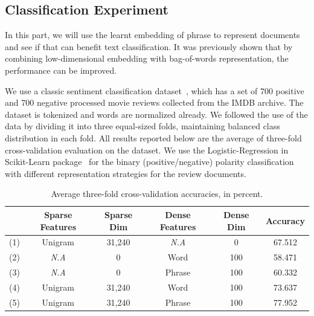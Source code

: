 \subsection{Classification Experiment}

In this part, we will use the learnt embedding of phrase to represent documents
and see if that can benefit text classification. It was previously shown that by
combining low-dimensional embedding with bag-of-words representation, the
performance can be improved.

We use a classic sentiment classification dataset~\cite{pang2002thumbs}, which
has a set of 700 positive and 700 negative processed movie reviews collected
from the IMDB archive. The dataset is tokenized and words are normalized
already. We followed the use of the data by dividing it into three equal-sized
folds, maintaining balanced class distribution in each fold.  All results
reported below are the average of three-fold cross-validation evaluation on the
dataset.  We use the Logistic-Regression in Scikit-Learn
package~\cite{scikit-learn} for the binary (positive/negative) polarity
classification with different representation strategies for the review
documents.

\begin{table}[h]
  \centering
  \begin{tabular}{c|c|c|c|c|c}
    & Sparse Features & Sparse Dim & Dense Features & Dense Dim & Accuracy \\
    \hline \hline
    (1) & Unigram     & 31,240 & \emph{N.A}  & 0   & 67.512 \\
    (2) & \emph{N.A}  & 0      & Word        & 100 & 58.471 \\
    (3) & \emph{N.A}  & 0      & Phrase      & 100 & 60.332 \\
    (4) & Unigram     & 31,240 & Word        & 100 & 73.637 \\
    (5) & Unigram     & 31,240 & Phrase      & 100 & 77.952 \\ \hline \hline
  \end{tabular}
  \caption{Average three-fold cross-validation accuracies, in percent.}
  \label{tab::plans_cls}
\end{table}

